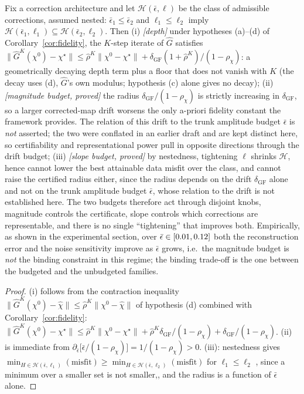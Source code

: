 \documentclass[journal,cmes,article,submit,moreauthors,pdftex]{Definitions/tsp}
\newcommand{\norm}[1]{\lVert #1 \rVert}
\newcommand{\numv}[1]{#1}
\begin{document}
\begin{Proposition}\label{prop:tri}
Fix a correction architecture and let $\mathcal{H}(\bar\epsilon,\ell)$ be the class of admissible
corrections, assumed nested: $\bar\epsilon_1\le\bar\epsilon_2$ and $\ell_1\le\ell_2$ imply
$\mathcal{H}(\bar\epsilon_1,\ell_1)\subseteq\mathcal{H}(\bar\epsilon_2,\ell_2)$. Then
(i) \emph{[depth]} under hypotheses (a)--(d) of Corollary~\ref{cor:fidelity}, the $K$-step iterate
of $\hat G$ satisfies $\norm{\hat G^{K}(\chi^{0})-\chi^{\star}}\le\hat\rho^{K}\norm{\chi^{0}-\chi^{\star}}
+\delta_{\mathrm{GF}}(1+\hat\rho^{K})/(1-\rho_\chi)$: a geometrically decaying depth term plus a floor that
does not vanish with $K$ (the decay uses (d), $\hat G$'s own modulus; hypothesis (c) alone gives no
decay);
(ii) \emph{[magnitude budget, proved]} the radius $\delta_{\mathrm{GF}}/(1-\rho_\chi)$ is strictly
increasing in $\delta_{\mathrm{GF}}$, so a larger corrected-map drift worsens the only a-priori
fidelity constant the framework provides. The relation of this drift to the trunk amplitude budget
$\bar\epsilon$ is \emph{not} asserted; the two were conflated in an earlier draft and are kept distinct
here, so certifiability and representational power pull in opposite directions through the drift budget;
(iii) \emph{[slope budget, proved]} by nestedness, tightening $\ell$ shrinks $\mathcal{H}$, hence
cannot lower the best attainable data misfit over the class, and cannot raise the certified radius
either, since the radius depends on the drift $\delta_{\mathrm{GF}}$ alone and not on the trunk amplitude budget $\bar\epsilon$, whose relation to the drift is not established here.
The two budgets therefore act through disjoint knobs, magnitude controls the certificate, slope
controls which corrections are representable, and there is no single ``tightening'' that improves
both. Empirically, as shown in the experimental section, over
$\bar\epsilon\in[\numv{\NumEbWorst},\numv{\NumEbBest}]$ both the reconstruction error and the
noise sensitivity improve as $\bar\epsilon$ grows, i.e.\ the magnitude budget is \emph{not} the
binding constraint in this regime; the binding trade-off is the one between the budgeted and the
unbudgeted families.
\end{Proposition}
\begin{proof}
(i) follows from the contraction inequality
$\norm{\hat G^{K}(\chi^{0})-\hat\chi}\le\hat\rho^{K}\norm{\chi^{0}-\hat\chi}$ of hypothesis (d)
combined with Corollary~\ref{cor:fidelity}:
$\norm{\hat G^{K}(\chi^{0})-\chi^{\star}}\le\hat\rho^{K}\norm{\chi^{0}-\chi^{\star}}
+\hat\rho^{K}\delta_{\mathrm{GF}}/(1-\rho_\chi)+\delta_{\mathrm{GF}}/(1-\rho_\chi)$. (ii) is immediate from
$\partial_{\bar\epsilon}\big[\bar\epsilon/(1-\rho_\chi)\big]=1/(1-\rho_\chi)>0$. (iii): nestedness
gives $\min_{H\in\mathcal{H}(\bar\epsilon,\ell_1)}(\text{misfit})\ge
\min_{H\in\mathcal{H}(\bar\epsilon,\ell_2)}(\text{misfit})$ for $\ell_1\le\ell_2$ , since a minimum over a smaller set is not smaller,, and the radius is a function of $\bar\epsilon$ alone.
\end{proof}
\end{document}
